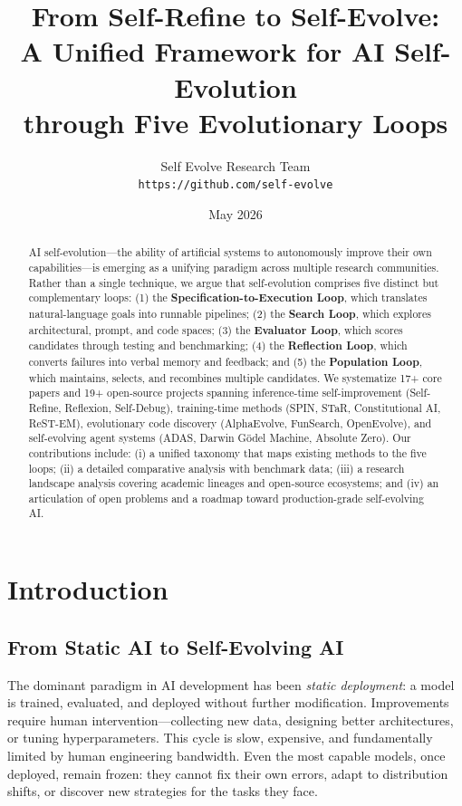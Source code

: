 \documentclass[11pt,a4paper]{article}
\title{\LARGE\bfseries From Self-Refine to Self-Evolve:\\A Unified Framework for AI Self-Evolution\\through Five Evolutionary Loops}
\author{
  Self Evolve Research Team\\[0.5em]
  \texttt{https://github.com/self-evolve}
}
\date{May 2026}
\begin{document}
\maketitle

\begin{abstract}
AI self-evolution---the ability of artificial systems to autonomously improve their own capabilities---is emerging as a unifying paradigm across multiple research communities. Rather than a single technique, we argue that self-evolution comprises five distinct but complementary loops: (1) the \textbf{Specification-to-Execution Loop}, which translates natural-language goals into runnable pipelines; (2) the \textbf{Search Loop}, which explores architectural, prompt, and code spaces; (3) the \textbf{Evaluator Loop}, which scores candidates through testing and benchmarking; (4) the \textbf{Reflection Loop}, which converts failures into verbal memory and feedback; and (5) the \textbf{Population Loop}, which maintains, selects, and recombines multiple candidates. We systematize 17+ core papers and 19+ open-source projects spanning inference-time self-improvement (Self-Refine, Reflexion, Self-Debug), training-time methods (SPIN, STaR, Constitutional AI, ReST-EM), evolutionary code discovery (AlphaEvolve, FunSearch, OpenEvolve), and self-evolving agent systems (ADAS, Darwin G\"{o}del Machine, Absolute Zero). Our contributions include: (i) a unified taxonomy that maps existing methods to the five loops; (ii) a detailed comparative analysis with benchmark data; (iii) a research landscape analysis covering academic lineages and open-source ecosystems; and (iv) an articulation of open problems and a roadmap toward production-grade self-evolving AI.
\end{abstract}

\section{Introduction}
\label{sec:introduction}

\subsection{From Static AI to Self-Evolving AI}

The dominant paradigm in AI development has been \emph{static deployment}: a model is trained, evaluated, and deployed without further modification. Improvements require human intervention---collecting new data, designing better architectures, or tuning hyperparameters. This cycle is slow, expensive, and fundamentally limited by human engineering bandwidth. Even the most capable models, once deployed, remain frozen: they cannot fix their own errors, adapt to distribution shifts, or discover new strategies for the tasks they face.
\end{document}
